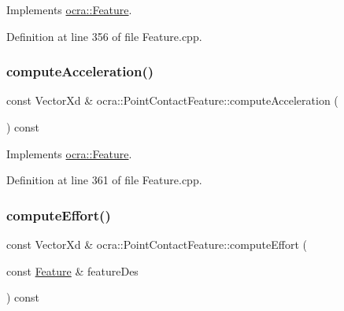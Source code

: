 Implements \hyperlink{classocra_1_1Feature_a4a5973d27459d2dececec8dc73038df8}{ocra\+::\+Feature}.



Definition at line 356 of file Feature.\+cpp.

\hypertarget{classocra_1_1PointContactFeature_a4266a665917b98bb507c4047c9bf6c0c}{}\label{classocra_1_1PointContactFeature_a4266a665917b98bb507c4047c9bf6c0c} 
\subsubsection{\texorpdfstring{compute\+Acceleration()}{computeAcceleration()}\hspace{0.1cm}{\footnotesize\ttfamily [2/2]}}
{\footnotesize\ttfamily const Vector\+Xd \& ocra\+::\+Point\+Contact\+Feature\+::compute\+Acceleration (\begin{DoxyParamCaption}{ }\end{DoxyParamCaption}) const\hspace{0.3cm}{\ttfamily [virtual]}}



Implements \hyperlink{classocra_1_1Feature_aa42b61d4255116caa92042d01ca36b79}{ocra\+::\+Feature}.



Definition at line 361 of file Feature.\+cpp.

\hypertarget{classocra_1_1PointContactFeature_a081fc445440857623f3df1b272a80871}{}\label{classocra_1_1PointContactFeature_a081fc445440857623f3df1b272a80871} 
\subsubsection{\texorpdfstring{compute\+Effort()}{computeEffort()}\hspace{0.1cm}{\footnotesize\ttfamily [1/2]}}
{\footnotesize\ttfamily const Vector\+Xd \& ocra\+::\+Point\+Contact\+Feature\+::compute\+Effort (\begin{DoxyParamCaption}\item[{const \hyperlink{classocra_1_1Feature}{Feature} \&}]{feature\+Des }\end{DoxyParamCaption}) const\hspace{0.3cm}{\ttfamily [virtual]}}



